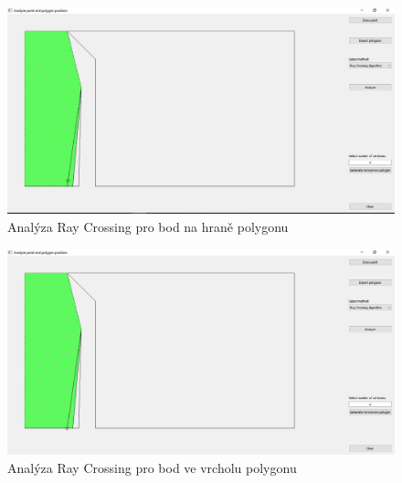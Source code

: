 \documentclass[a4paper,11pt,twoside]{article}
\begin{document}
\vspace{0.2cm}
\begin{figure}[hbt!] 
\begin{center}
\includegraphics[width=15cm]{pictures/rayonline.png} 
\caption[Analýza Ray Crossing pro bod na hraně polygonu]{Analýza Ray Crossing pro bod na hraně polygonu}
\label{fig:rayonline}
\end{center}
\end{figure}

\vspace{0.2cm}
\begin{figure}[hbt!] 
\begin{center}
\includegraphics[width=15cm]{pictures/rayonpoint.png} 
\caption[Analýza Ray Crossing pro bod ve vrcholu polygonu]{Analýza Ray Crossing pro bod ve vrcholu polygonu}
\label{fig:rayonpoint}
\end{center}
\end{figure}
\end{document}
